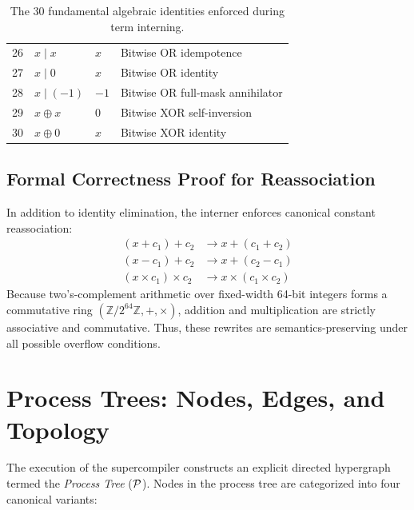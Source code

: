 \begin{table}[h!]
\begin{tabular}{clll}
26 & $x \mathbin{|} x$ & $x$ & Bitwise OR idempotence \\
27 & $x \mathbin{|} 0$ & $x$ & Bitwise OR identity \\
28 & $x \mathbin{|} (-1)$ & $-1$ & Bitwise OR full-mask annihilator \\
29 & $x \oplus x$ & $0$ & Bitwise XOR self-inversion \\
30 & $x \oplus 0$ & $x$ & Bitwise XOR identity \\
\bottomrule
\end{tabular}
\caption{The 30 fundamental algebraic identities enforced during term interning.}
\label{tab:algebraic_identities}
\end{table}

\subsection{Formal Correctness Proof for Reassociation}
In addition to identity elimination, the interner enforces canonical constant reassociation:
\begin{align}
(x + c_1) + c_2 &\longrightarrow x + (c_1 + c_2) \\
(x - c_1) + c_2 &\longrightarrow x + (c_2 - c_1) \\
(x \times c_1) \times c_2 &\longrightarrow x \times (c_1 \times c_2)
\end{align}
Because two's-complement arithmetic over fixed-width 64-bit integers forms a commutative ring $(\mathbb{Z} / 2^{64}\mathbb{Z}, +, \times)$, addition and multiplication are strictly associative and commutative. Thus, these rewrites are semantics-preserving under all possible overflow conditions.

\section{Process Trees: Nodes, Edges, and Topology}
\label{sec:symbolic_state:trees}

The execution of the supercompiler constructs an explicit directed hypergraph termed the \emph{Process Tree} ($\mathcal{P}$). Nodes in the process tree are categorized into four canonical variants:

